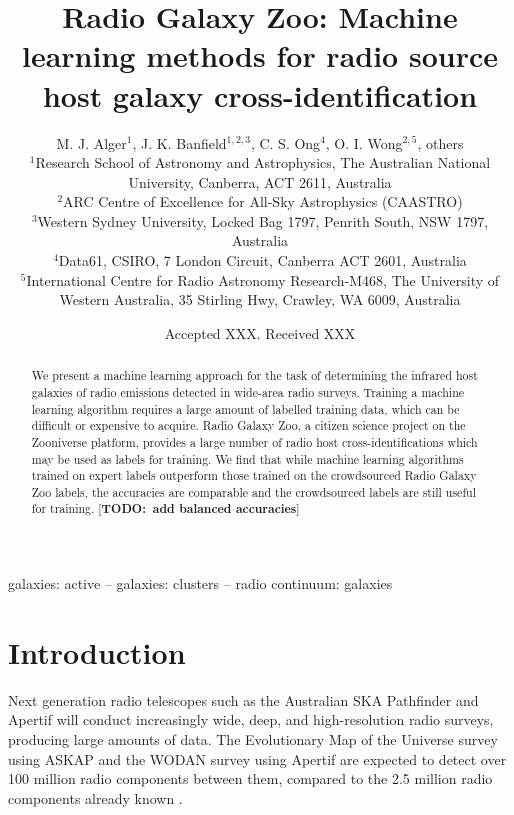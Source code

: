 \documentclass[fleqn,usenatbib,usedcolumn]{mnras}
\title[ML CDFS]{Radio Galaxy Zoo: Machine learning methods for radio source host galaxy cross-identification}
\author[RGZ ML Team]{M. J. Alger$^{1}$, J. K. Banfield$^{1, 2, 3}$, C. S. Ong$^{4}$, O. I. Wong$^{2, 5}$, others
\\
$^{1}$Research School of Astronomy and Astrophysics, The Australian National University, Canberra, ACT 2611, Australia\\
$^{2}$ARC Centre of Excellence for All-Sky Astrophysics (CAASTRO)\\
$^{3}$Western Sydney University, Locked Bag 1797, Penrith South, NSW 1797, Australia\\
$^{4}$Data61, CSIRO, 7 London Circuit, Canberra ACT 2601, Australia\\
$^{5}$International Centre for Radio Astronomy Research-M468, The University of Western Australia, 35 Stirling Hwy, Crawley, WA 6009, Australia
}
\date{Accepted XXX. Received XXX}
\newcommand{\todo}[1]{ {\color{red}[{\bf TODO:~{#1}}]} }
\begin{document}
\label{firstpage}
\pagerange{\pageref{firstpage}--\pageref{lastpage}}
\maketitle

\begin{abstract}
  We present a machine learning approach for the task of determining the
  infrared host galaxies of radio emissions detected in wide-area radio surveys.
  Training a machine learning algorithm requires a large amount of labelled
  training data, which can be difficult or expensive to acquire. Radio Galaxy
  Zoo, a citizen science project on the Zooniverse platform, provides a large
  number of radio host cross-identifications which may be used as labels for
  training. We find that while machine learning algorithms trained on expert
  labels outperform those trained on the crowdsourced Radio Galaxy Zoo labels,
  the accuracies are comparable and the crowdsourced labels are still useful for
  training. \todo{add balanced accuracies}
\end{abstract}

\begin{keywords}
galaxies: active -- galaxies: clusters -- radio continuum: galaxies
\end{keywords}


\section{Introduction}\label{introduction}

  Next generation radio telescopes such as the Australian SKA Pathfinder
  \citep[ASKAP;][]{johnston07} and Apertif \citep{verheijen08} will conduct
  increasingly wide, deep, and high-resolution radio surveys, producing large
  amounts of data. The Evolutionary Map of the Universe survey
  \citep[EMU;][]{norris11} using ASKAP and the WODAN survey \citep{rottgering11}
  using Apertif are expected to detect over 100 million radio components between
  them, compared to the 2.5 million radio components already known
  \citep{banfield15}.
\end{document}

